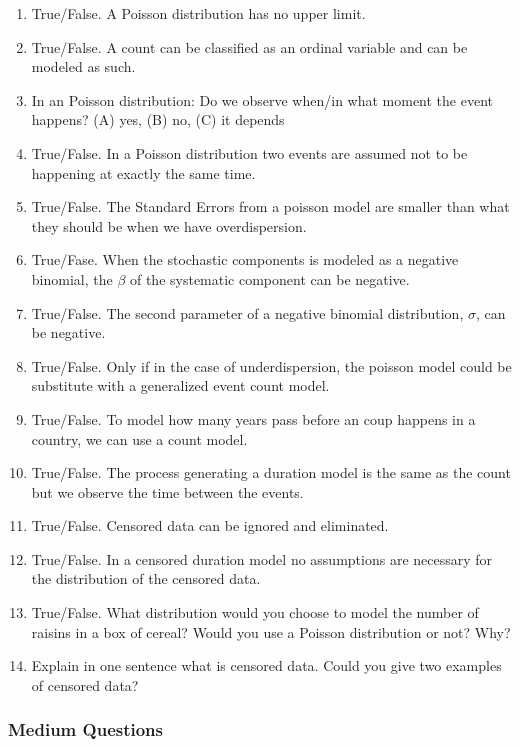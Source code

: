 \documentclass[11pt]{article}
\begin{document}
\begin{enumerate}
\item True/False. A Poisson distribution has no upper limit.
\item True/False. A count can be classified as an ordinal variable and can be modeled as such.
\item In an Poisson distribution: Do we observe when/in what moment the event happens? (A) yes, (B) no, (C) it depends 
\item True/False. In a Poisson distribution two events are assumed not to be happening at exactly the same time.
\item True/False. The Standard Errors from a poisson model are smaller than what they should be when we have overdispersion.
\item True/Fase. When the stochastic components is modeled as a negative binomial, the $\beta$ of the systematic component can  be negative.
\item True/False. The second parameter of a negative binomial distribution, $\sigma$, can be negative.
\item True/False. Only if in the case of underdispersion, the poisson model could be substitute with a generalized event count model.
\item True/False. To model how many years pass before an coup happens in a country, we can use a count model.
\item True/False. The process generating a duration model  is the same as the count but we observe the time between the events.
\item True/False. Censored data can be ignored and eliminated.
\item True/False. In a censored duration model no assumptions are necessary for the distribution of the censored data.
\item True/False. What distribution would you choose to model the number of raisins in a box of cereal? Would you use a Poisson distribution or not? Why?
\item Explain in one sentence what is censored data. Could you give two examples of censored data? 
\end{enumerate}

\subsubsection{Medium Questions}
\end{document}
